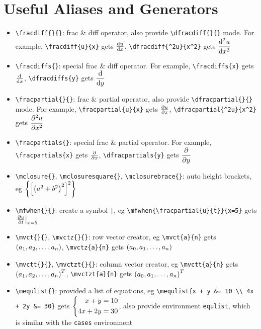 \documentclass{article}
\begin{document}
\section{Useful Aliases and Generators}
\begin{itemize}
\item \lstinline`\fracdiff{}{}`: frac \& diff operator, also provide \lstinline`\dfracdiff{}{}` mode. For example, \lstinline`\fracdiff{u}{x}` gets ${\frac{\operatorname{d\!} {u}}{\operatorname{d\!} {x}}}$, \lstinline`\dfracdiff{^2u}{x^2}` gets ${\dfrac{\operatorname{d\!} {^2u}}{\operatorname{d\!} {x^2}}}$

\item \lstinline`\fracdiffs{}`: special frac \& diff operator. For example, \lstinline`\fracdiffs{x}` gets ${{\frac{\operatorname{d\!} {}}{\operatorname{d\!} {x}}}}$, \lstinline`\dfracdiffs{y}` gets ${{\dfrac{\operatorname{d\!} {}}{\operatorname{d\!} {y}}}}$

\item \lstinline`\fracpartial{}{}`: frac \& partial operator, also provide \lstinline`\dfracpartial{}{}` mode. For example, \lstinline`\fracpartial{u}{x}` gets ${\frac{\partial {u}}{\partial {x}}}$, \lstinline`\dfracpartial{^2u}{x^2}` gets ${\dfrac{\partial {^2u}}{\partial {x^2}}}$

\item \lstinline`\fracpartials{}`: special frac \& partial operator. For example, \lstinline`\fracpartials{x}` gets ${{\frac{\partial {}}{\partial {x}}}}$, \lstinline`\dfracpartials{y}` gets ${{\dfrac{\partial {}}{\partial {y}}}}$

\item \lstinline`\mclosure{}`, \lstinline`\mclosuresquare{}`, \lstinline`\mclosurebrace{}`: auto height brackets, eg ${\left\{ { {\left[ { {\left( {a^2 + b^2} \right)}^2 } \right]}^2 } \right\}}$

\item \lstinline`\mfwhen{}{}`: create a symbol \lstinline`|`, eg \lstinline`\mfwhen{\fracpartial{u}{t}}{x=5}` gets ${\left.{{\frac{\partial {u}}{\partial {t}}}} \right|}_{x=5}$

\item \lstinline`\mvct{}{}`, \lstinline`\mvctz{}{}`: row vector creator, eg \lstinline`\mvct{a}{n}` gets ${ ({a}_1, {a}_2, \ldots, {a}_{n}) }$, \lstinline`\mvctz{a}{n}` gets ${ ({a}_0, {a}_1, \ldots, {a}_{n}) }$

\item \lstinline`\mvctt{}{}`, \lstinline`\mvctzt{}{}`: column vector creator, eg \lstinline`\mvctt{a}{n}` gets ${ { ({a}_1, {a}_2, \ldots, {a}_{n}) }^T }$, \lstinline`\mvctzt{a}{n}` gets ${ { ({a}_0, {a}_1, \ldots, {a}_{n}) }^T }$

\item \lstinline`\mequlist{}`: provided a list of equations, eg \lstinline`\mequlist{x + y &= 10 \\ 4x + 2y &= 30}` gets ${\left\{ \begin{aligned} x + y &= 10 \\ 4x + 2y &= 30 \end{aligned} \right.}$, also provide environment \lstinline`equlist`, which is similar with the \lstinline`cases` environment
\end{itemize}

\end{document}
